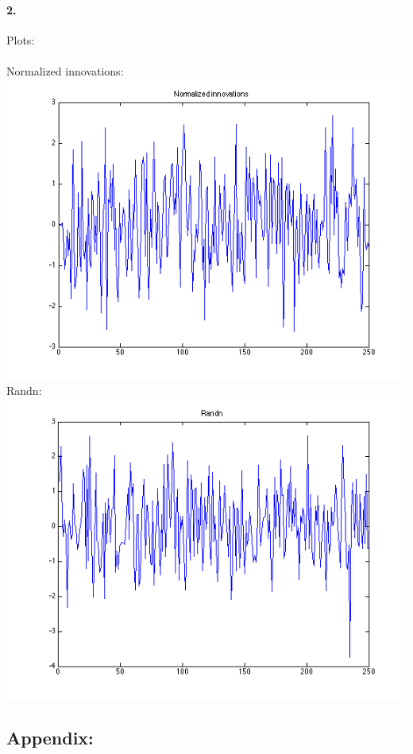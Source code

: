 \documentclass[a4paper]{article}
\begin{document}
\paragraph{2. } Plots:\\
\\
Normalized innovations:\\
\includegraphics[scale=.8]{normalized_innovations.png}\\
Randn:\\
\includegraphics[scale=.8]{randn.png}

\newpage
\subsection*{Appendix:}



\end{document}
